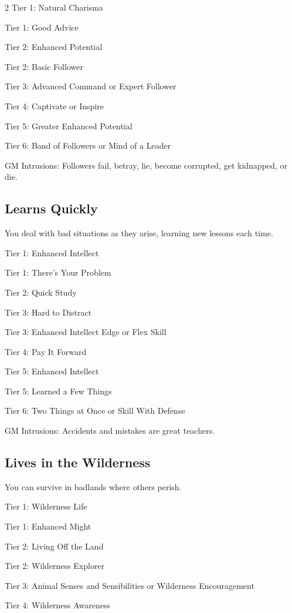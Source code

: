 \begin{multicols}{2}
Tier 1: Natural Charisma

Tier 1: Good Advice

Tier 2: Enhanced Potential

Tier 2: Basic Follower

Tier 3: Advanced Command or Expert Follower

Tier 4: Captivate  or Inspire

Tier 5: Greater Enhanced Potential

Tier 6: Band of Followers or Mind of a Leader

GM Intrusions: Followers fail, betray, lie, become corrupted, get kidnapped, or die.

\subsection{Learns Quickly}

You deal with bad situations as they arise, learning new lessons each time.

Tier 1: Enhanced Intellect

Tier 1: There’s Your Problem

Tier 2: Quick Study

Tier 3: Hard to Distract

Tier 3: Enhanced Intellect Edge or Flex Skill

Tier 4: Pay It Forward

Tier 5: Enhanced Intellect

Tier 5: Learned a Few Things

Tier 6: Two Things at Once or Skill With Defense

GM Intrusions: Accidents and mistakes are great teachers.

\subsection{Lives in the Wilderness}

You can survive in badlands where others perish.

Tier 1: Wilderness Life

Tier 1: Enhanced Might

Tier 2: Living Off the Land

Tier 2: Wilderness Explorer

Tier 3: Animal Senses and Sensibilities or Wilderness Encouragement

Tier 4: Wilderness Awareness


\end{multicols}
